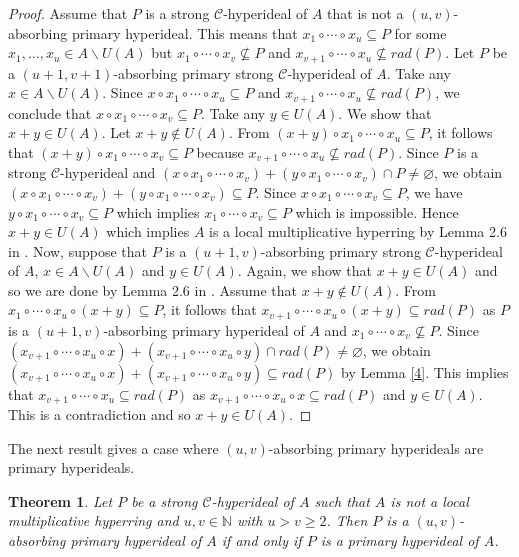 \documentclass[preprint,review,10pt]{amsart}
\newtheorem{theorem}{Theorem}[section]
\theoremstyle{definition}
\theoremstyle{remark}
\numberwithin{equation}{section}
\begin{document}
\begin{proof}
Assume that $P$ is a strong $\mathcal{C}$-hyperideal of $A$ that is not a $(u,v)$-absorbing primary hyperideal. This means that  $x_1\circ \cdots \circ x_u \subseteq P$ for some $x_1,\ldots,x_u \in A \backslash U(A)$  but $x_1\circ \cdots \circ x_v \nsubseteq P$ and $x_{v+1} \circ \cdots \circ x_u \nsubseteq rad(P)$. Let $P$ be  a $(u+1,v+1)$-absorbing primary strong $\mathcal{C}$-hyperideal of $A$. Take any $x \in A \backslash U(A)$. Since $x \circ x_1 \circ \cdots \circ x_u \subseteq P$ and $x_{v+1} \circ \cdots \circ x_u \nsubseteq rad(P)$, we conclude that $x \circ x_1\circ \cdots \circ x_v \subseteq P$. Take any $y \in U(A)$. We show that $x+y  \in U(A)$. Let $x+y  \notin U(A)$. From $(x+y) \circ x_1 \circ \cdots \circ x_u \subseteq P$, it follows that $(x+y) \circ x_1\circ \cdots \circ x_v \subseteq P$ because $x_{v+1} \circ \cdots \circ x_u \nsubseteq rad(P)$. Since $P$ is a strong $\mathcal{C}$-hyperideal and $(x \circ x_1\circ \cdots \circ x_v)+(y \circ x_1\circ \cdots \circ x_v) \cap P \neq \varnothing$, we obtain $(x \circ x_1\circ \cdots \circ x_v)+(y \circ x_1\circ \cdots \circ x_v) \subseteq  P$. Since $x \circ x_1 \circ \cdots \circ x_v \subseteq P$, we have $y \circ x_1\circ \cdots \circ x_v \subseteq  P$ which implies $x_1\circ \cdots \circ x_v \subseteq  P$ which is impossible. Hence $x+y  \in U(A)$ which implies $A$ is a local multiplicative hyperring by Lemma 2.6 in \cite{Ghiasvand2}. Now, suppose that $P$ is a $(u+1,v)$-absorbing primary strong $\mathcal{C}$-hyperideal of $A$, $x \in A \backslash U(A)$ and $y \in U(A)$. Again, we show that $x+y  \in U(A)$ and so we are done by Lemma 2.6 in \cite{Ghiasvand2}. Assume that $x+y  \notin U(A)$.  From $ x_1\circ \cdots \circ x_u \circ (x+y) \subseteq P$, it follows that $x_{v+1} \circ \cdots \circ x_u \circ (x+y)\subseteq rad(P)$ as $P$ is a $(u+1,v)$-absorbing primary hyperideal of $A$ and $x_1\circ \cdots \circ x_v \nsubseteq P$. Since $(x_{v+1} \circ \cdots \circ x_u \circ x)+(x_{v+1} \circ \cdots \circ x_u \circ y)\cap rad(P) \neq \varnothing $, we obtain  $(x_{v+1} \circ \cdots \circ x_u \circ x)+(x_{v+1} \circ \cdots \circ x_u \circ y)\subseteq  rad(P) $ by Lemma \ref{4}. This implies that $x_{v+1} \circ \cdots \circ x_u \subseteq  rad(P) $ as $x_{v+1} \circ \cdots \circ x_u \circ x \subseteq rad(P)$ and $y \in U(A)$. This is a contradiction and so $x+y  \in U(A)$.
\end{proof}
The next result gives a case where $(u,v)$-absorbing primary hyperideals are primary hyperideals. 
\begin{theorem} \label{7}
Let $P$ be a strong $\mathcal{C}$-hyperideal of $A$ such that $A$ is not a local multiplicative hyperring and $u,v \in \mathbb{N}$ with $u >v\geq2$. Then $P$ is a $(u,v)$-absorbing primary hyperideal of $A$ if and only if $P$ is a primary hyperideal of $A$.
\end{theorem}
\end{document}
